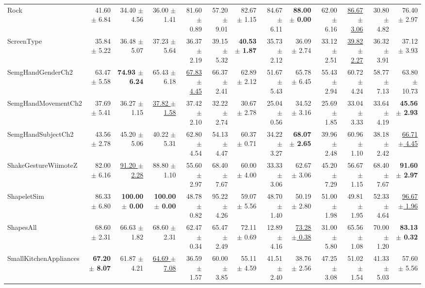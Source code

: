 \begin{landscape}
\begin{longtable}{lrrrrrrrrrrrr}
Rock & 41.60 $\pm$ 6.84 & 34.40 $\pm$ 4.56 & 36.00 $\pm$ 1.41 & 81.60 $\pm$ 0.89 & 57.20 $\pm$ 9.01 & 82.67 $\pm$ 1.15 & 84.67 $\pm$ 6.11 & \textbf{88.00 $\pm$ 0.00} & 62.00 $\pm$ 6.16 & \underline{86.67 $\pm$ 3.06} & 30.80 $\pm$ 4.82 & 76.40 $\pm$ 2.97 \\
ScreenType & 35.84 $\pm$ 5.22 & 36.48 $\pm$ 5.07 & 37.23 $\pm$ 5.64 & 36.37 $\pm$ 2.19 & 39.15 $\pm$ 5.32 & \textbf{40.53 $\pm$ 1.87} & 35.73 $\pm$ 2.12 & 36.09 $\pm$ 2.74 & 33.12 $\pm$ 2.51 & \underline{39.82 $\pm$ 2.27} & 36.32 $\pm$ 3.91 & 37.12 $\pm$ 3.93 \\
SemgHandGenderCh2 & 63.47 $\pm$ 5.58 & \textbf{74.93 $\pm$ 6.24} & 65.43 $\pm$ 6.18 & \underline{67.83 $\pm$ 4.45} & 66.37 $\pm$ 2.41 & 62.89 $\pm$ 2.12 & 51.67 $\pm$ 5.43 & 65.78 $\pm$ 6.45 & 55.43 $\pm$ 2.94 & 60.72 $\pm$ 4.24 & 58.77 $\pm$ 7.13 & 63.80 $\pm$ 10.73 \\
SemgHandMovementCh2 & 37.69 $\pm$ 5.41 & 36.27 $\pm$ 1.15 & \underline{37.82 $\pm$ 1.58} & 37.42 $\pm$ 2.10 & 32.22 $\pm$ 2.74 & 30.67 $\pm$ 2.78 & 25.04 $\pm$ 0.56 & 34.52 $\pm$ 3.16 & 25.69 $\pm$ 1.85 & 33.04 $\pm$ 3.33 & 33.64 $\pm$ 4.19 & \textbf{45.56 $\pm$ 2.93} \\
SemgHandSubjectCh2 & 43.56 $\pm$ 2.78 & 45.20 $\pm$ 5.06 & 40.22 $\pm$ 5.31 & 62.80 $\pm$ 4.54 & 54.13 $\pm$ 4.47 & 60.37 $\pm$ 0.71 & 34.22 $\pm$ 3.27 & \textbf{68.07 $\pm$ 2.65} & 39.96 $\pm$ 2.48 & 60.96 $\pm$ 1.10 & 38.18 $\pm$ 2.42 & \underline{66.71 $\pm$ 4.45} \\
ShakeGestureWiimoteZ & 82.00 $\pm$ 6.16 & \underline{91.20 $\pm$ 2.28} & 88.80 $\pm$ 1.10 & 55.60 $\pm$ 2.97 & 68.40 $\pm$ 7.67 & 60.00 $\pm$ 4.00 & 33.33 $\pm$ 3.06 & 62.67 $\pm$ 3.06 & 45.20 $\pm$ 7.29 & 56.67 $\pm$ 1.15 & 68.40 $\pm$ 7.67 & \textbf{91.60 $\pm$ 2.97} \\
ShapeletSim & 86.33 $\pm$ 6.80 & \textbf{100.00 $\pm$ 0.00} & \textbf{100.00 $\pm$ 0.00} & 48.78 $\pm$ 0.82 & 95.22 $\pm$ 4.26 & 59.07 $\pm$ 5.56 & 48.70 $\pm$ 1.40 & 50.19 $\pm$ 2.80 & 51.00 $\pm$ 1.98 & 49.81 $\pm$ 1.95 & 52.33 $\pm$ 4.64 & \underline{96.67 $\pm$ 1.96} \\
ShapesAll & 68.60 $\pm$ 2.31 & 66.63 $\pm$ 1.82 & 68.60 $\pm$ 2.31 & 62.47 $\pm$ 0.34 & 65.47 $\pm$ 2.49 & 72.11 $\pm$ 0.69 & 12.89 $\pm$ 4.16 & \underline{73.28 $\pm$ 0.38} & 31.00 $\pm$ 5.80 & 65.56 $\pm$ 1.08 & 70.00 $\pm$ 1.20 & \textbf{83.13 $\pm$ 0.32} \\
SmallKitchenAppliances & \textbf{67.20 $\pm$ 8.07} & 61.87 $\pm$ 4.21 & \underline{64.69 $\pm$ 7.08} & 36.59 $\pm$ 1.57 & 60.00 $\pm$ 3.85 & 55.11 $\pm$ 4.59 & 41.51 $\pm$ 2.40 & 38.76 $\pm$ 2.56 & 47.25 $\pm$ 3.08 & 51.02 $\pm$ 1.54 & 41.33 $\pm$ 5.03 & 57.60 $\pm$ 5.56 \\

\end{longtable}
\end{landscape}
